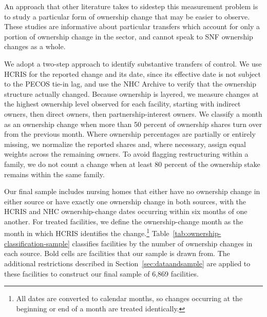 \documentclass[12pt]{article}
\begin{document}
An approach that other literature takes to sidestep this measurement problem is to study a particular form of ownership change that may be easier to observe. These studies are informative about particular transfers which account for only a portion of ownership change in the sector, and cannot speak to SNF ownership changes as a whole.

We adopt a two-step approach to identify substantive transfers of control. We use HCRIS for the reported change and its date, since its effective date is not subject to the PECOS tie-in lag, and use the NHC Archive to verify that the ownership structure actually changed. Because ownership is layered, we measure changes at the highest ownership level observed for each facility, starting with indirect owners, then direct owners, then partnership-interest owners. We classify a month as an ownership change when more than 50 percent of ownership shares turn over from the previous month. Where ownership percentages are partially or entirely missing, we normalize the reported shares and, where necessary, assign equal weights across the remaining owners. To avoid flagging restructuring within a family, we do not count a change when at least 80 percent of the ownership stake remains within the same family. 

Our final sample includes nursing homes that either have no ownership change in either source or have exactly one ownership change in both sources, with the HCRIS and NHC ownership-change dates occurring within six months of one another. For treated facilities, we define the ownership-change month as the month in which HCRIS identifies the change.\footnote{All dates are converted to calendar months, so changes occurring at the beginning or end of a month are treated identically.} Table~\ref{tab:ownership-classification-sample} classifies facilities by the number of ownership changes in each source. Bold cells are facilities that our sample is drawn from. The additional restrictions described in Section~\ref{sec:dataandsample} are applied to these facilities to construct our final sample of 6,869 facilities.
\end{document}
